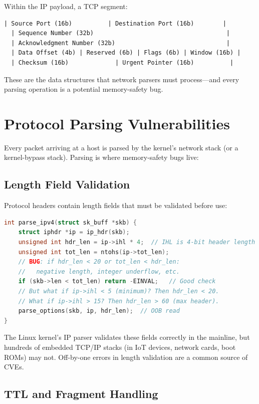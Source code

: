 Within the IP payload, a TCP segment:

\begin{lstlisting}[caption=TCP header (20 bytes)]
  | Source Port (16b)          | Destination Port (16b)        |
  | Sequence Number (32b)                                     |
  | Acknowledgment Number (32b)                               |
  | Data Offset (4b) | Reserved (6b) | Flags (6b) | Window (16b) |
  | Checksum (16b)             | Urgent Pointer (16b)          |
\end{lstlisting}

These are the data structures that network parsers must process---and every parsing operation is a potential memory-safety bug.

\section{Protocol Parsing Vulnerabilities}

Every packet arriving at a host is parsed by the kernel's network stack (or a kernel-bypass stack). Parsing is where memory-safety bugs live:

\subsection{Length Field Validation}

Protocol headers contain length fields that must be validated before use:

\begin{lstlisting}[language=C, caption=Vulnerable IP length parsing]
int parse_ipv4(struct sk_buff *skb) {
    struct iphdr *ip = ip_hdr(skb);
    unsigned int hdr_len = ip->ihl * 4;  // IHL is 4-bit header length
    unsigned int tot_len = ntohs(ip->tot_len);
    // BUG: if hdr_len < 20 or tot_len < hdr_len:
    //   negative length, integer underflow, etc.
    if (skb->len < tot_len) return -EINVAL;   // Good check
    // But what if ip->ihl < 5 (minimum)? Then hdr_len < 20.
    // What if ip->ihl > 15? Then hdr_len > 60 (max header).
    parse_options(skb, ip, hdr_len);  // OOB read
}
\end{lstlisting}

The Linux kernel's IP parser validates these fields correctly in the mainline, but hundreds of embedded TCP/IP stacks (in IoT devices, network cards, boot ROMs) may not. Off-by-one errors in length validation are a common source of CVEs.

\subsection{TTL and Fragment Handling}

